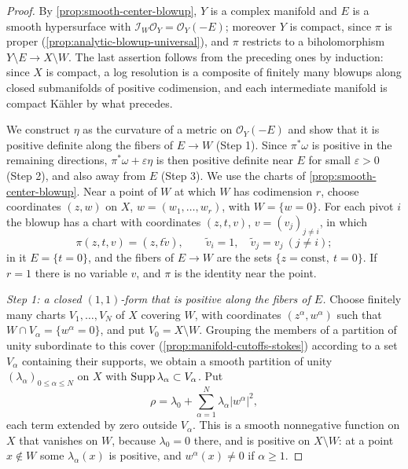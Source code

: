 \begin{proof}
By \cref{prop:smooth-center-blowup}, $Y$ is a complex manifold and $E$ is a smooth hypersurface with $\mathcal I_W\mathcal O_Y=\mathcal O_Y(-E)$; moreover $Y$ is compact, since $\pi$ is proper (\cref{prop:analytic-blowup-universal}), and $\pi$ restricts to a biholomorphism $Y\setminus E\to X\setminus W$. The last assertion follows from the preceding ones by induction: since $X$ is compact, a log resolution is a composite of finitely many blowups along closed submanifolds of positive codimension, and each intermediate manifold is compact K\"ahler by what precedes.

We construct $\eta$ as the curvature of a metric on $\mathcal O_Y(-E)$ and show that it is positive definite along the fibers of $E\to W$ (Step 1). Since $\pi^*\omega$ is positive in the remaining directions, $\pi^*\omega+\varepsilon\eta$ is then positive definite near $E$ for small $\varepsilon>0$ (Step 2), and also away from $E$ (Step 3). We use the charts of \cref{prop:smooth-center-blowup}. Near a point of $W$ at which $W$ has codimension $r$, choose coordinates $(z,w)$ on $X$, $w=(w_1,\ldots,w_r)$, with $W=\{w=0\}$. For each pivot $i$ the blowup has a chart with coordinates $(z,t,v)$, $v=(v_j)_{j\neq i}$, in which
\[
 \pi(z,t,v)=(z,t\tilde v),\qquad \tilde v_i=1,\quad\tilde v_j=v_j\ (j\neq i);
\]
in it $E=\{t=0\}$, and the fibers of $E\to W$ are the sets $\{z=\text{const},\ t=0\}$. If $r=1$ there is no variable $v$, and $\pi$ is the identity near the point.

\emph{Step 1: a closed $(1,1)$-form that is positive along the fibers of $E$.} Choose finitely many charts $V_1,\ldots,V_N$ of $X$ covering $W$, with coordinates $(z^\alpha,w^\alpha)$ such that $W\cap V_\alpha=\{w^\alpha=0\}$, and put $V_0=X\setminus W$. Grouping the members of a partition of unity subordinate to this cover (\cref{prop:manifold-cutoffs-stokes}) according to a set $V_\alpha$ containing their supports, we obtain a smooth partition of unity $(\lambda_\alpha)_{0\leq\alpha\leq N}$ on $X$ with $\operatorname{Supp}\lambda_\alpha\subset V_\alpha$. Put
\[
 \rho=\lambda_0+\sum_{\alpha=1}^N\lambda_\alpha|w^\alpha|^2,
\]
each term extended by zero outside $V_\alpha$. This is a smooth nonnegative function on $X$ that vanishes on $W$, because $\lambda_0=0$ there, and is positive on $X\setminus W$: at a point $x\notin W$ some $\lambda_\alpha(x)$ is positive, and $w^\alpha(x)\neq0$ if $\alpha\geq1$.


\end{proof}
